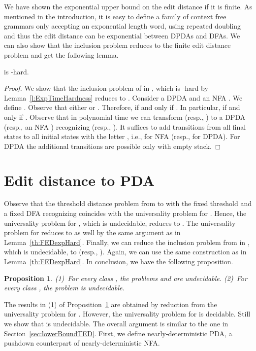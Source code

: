 \documentclass{CSML}
\newtheorem{proposition}[theorem]{Proposition}
\begin{document}
We have shown the exponential upper bound on the edit distance if it is finite.
As mentioned in the introduction, it is easy to define a family of context free grammars only accepting an exponential length word, using repeated doubling and thus the edit distance can be exponential between DPDAs and DFAs.
We can also show that the inclusion problem reduces to the finite edit distance problem  and get the following lemma. 


\begin{lem}
 is -hard.
\label{th:FEDexpHard}
\end{lem}
\begin{proof}
We show that the inclusion problem of  in , which is -hard by Lemma~\ref{l:ExpTimeHardness} reduces to 
. 
Consider  a DPDA  and an NFA .
We define .
Observe that either   or .
Therefore,  if and only if 
. 
In particular,  if and only if
.
Observe that in polynomial time we can transform  (resp., ) to 
a DPDA  (resp., an NFA ) recognizing
 (resp., ). 
It suffices to add transitions 
from all final states to all initial states with the letter , i.e.,
 for NFA (resp.,  for DPDA).
For DPDA the additional transitions are possible only with empty stack.
\end{proof}



 

\section{Edit distance to PDA}
\makeatletter{}\label{s:fromPDA}

Observe that the threshold distance problem from  to  with the fixed threshold 
and a fixed DFA recognizing  coincides with the universality problem for . 
Hence, the universality problem for , which is undecidable, reduces to .
The universality problem for  reduces to  as well by 
the same argument as in Lemma~\ref{th:FEDexpHard}. 
Finally, we can reduce the inclusion problem from  in , which is undecidable, to
 (resp., ). Again, we can use 
the same construction as in Lemma~\ref{th:FEDexpHard}. 
In conclusion, we have the following proposition.

\begin{proposition}
(1)~For every class , the problems
 and  are undecidable.
(2)~For every class , the problem
 is undecidable.
\label{p:undecidable}
\end{proposition}

The results in (1) of Proposition~\ref{p:undecidable} are obtained by reduction from
the universality problem for . However, the universality problem for  is 
decidable. Still we show that  is undecidable.
The overall argument is similar to the one in Section~\ref{sec:lowerBoundTED}.
First, we define nearly-deterministic PDA, a pushdown counterpart of nearly-deterministic NFA.
\end{document}
